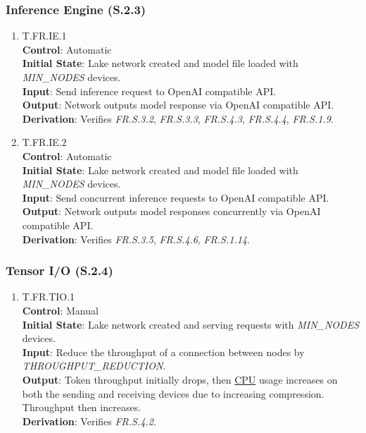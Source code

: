 \documentclass[12pt, titlepage]{article}
\providecommand{\glink}[2]{\hyperlink{gls:#1}{#2}}
\begin{document}
\subsubsection{Inference Engine (S.2.3)}
\begin{enumerate}
	\item{T.FR.IE.1}\label{T.FR.IE.1} \\
		\textbf{Control}: Automatic \\
		\textbf{Initial State}: Lake network created and model file loaded with \textit{MIN\_NODES} devices. \\
		\textbf{Input}: Send inference request to OpenAI compatible API. \\
		\textbf{Output}: Network outputs model response via OpenAI compatible API. \\
		\textbf{Derivation}: Verifies \textit{FR.S.3.2}, \textit{FR.S.3.3}, \textit{FR.S.4.3}, \textit{FR.S.4.4},
		\textit{FR.S.1.9}.
	\item{T.FR.IE.2}\label{T.FR.IE.2} \\
		\textbf{Control}: Automatic \\
		\textbf{Initial State}: Lake network created and model file loaded with \textit{MIN\_NODES} devices. \\
		\textbf{Input}: Send concurrent inference requests to OpenAI compatible API. \\
		\textbf{Output}: Network outputs model responses concurrently via OpenAI compatible API. \\
		\textbf{Derivation}: Verifies \textit{FR.S.3.5}, \textit{FR.S.4.6}, \textit{FR.S.1.14}.
\end{enumerate}
\subsubsection{Tensor I/O (S.2.4)}
\begin{enumerate}
	\item{T.FR.TIO.1}\label{T.FR.TIO.1} \\
		\textbf{Control}: Manual \\
		\textbf{Initial State}: Lake network created and serving requests with \textit{MIN\_NODES} devices. \\
		\textbf{Input}: Reduce the throughput of a connection between nodes by \textit{THROUGHPUT\_REDUCTION}. \\
		\textbf{Output}: Token throughput initially drops, then \glink{cpu}{CPU} usage increases on both the
		sending and receiving devices due to increasing compression. Throughput then increases. \\
		\textbf{Derivation}: Verifies \textit{FR.S.4.2}.
\end{enumerate}
\end{document}
